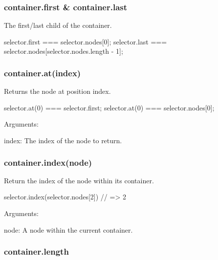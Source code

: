 \subsubsection*{{\ttfamily container.\+first} \& {\ttfamily container.\+last}}

The first/last child of the container.


\begin{DoxyCode}
selector.first === selector.nodes[0];
selector.last === selector.nodes[selector.nodes.length - 1];
\end{DoxyCode}


\subsubsection*{{\ttfamily container.\+at(index)}}

Returns the node at position {\ttfamily index}.


\begin{DoxyCode}
selector.at(0) === selector.first;
selector.at(0) === selector.nodes[0];
\end{DoxyCode}


Arguments\+:


\begin{DoxyItemize}
\item {\ttfamily index}\+: The index of the node to return.
\end{DoxyItemize}

\subsubsection*{{\ttfamily container.\+index(node)}}

Return the index of the node within its container.


\begin{DoxyCode}
selector.index(selector.nodes[2]) // => 2
\end{DoxyCode}


Arguments\+:


\begin{DoxyItemize}
\item {\ttfamily node}\+: A node within the current container.
\end{DoxyItemize}

\subsubsection*{{\ttfamily container.\+length}}

